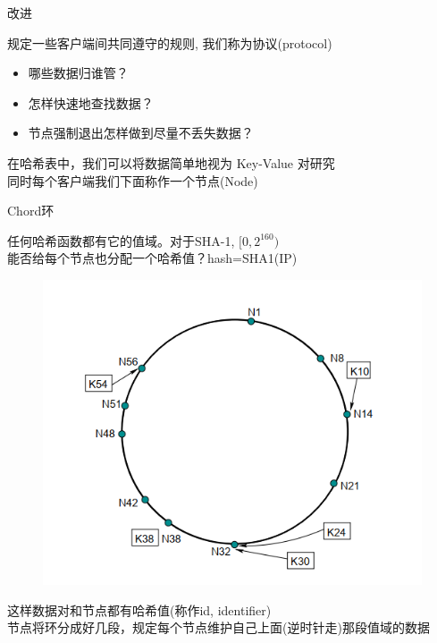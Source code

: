 \documentclass[10pt]{beamer}
\begin{document}
\begin{frame}{改进}

规定一些客户端间共同遵守的规则, 我们称为\alert{协议(protocol)}
	\begin{itemize}
		\item 哪些数据归谁管？
		\item 怎样快速地查找数据？
		\item 节点强制退出怎样做到尽量不丢失数据？
	\end{itemize}
在哈希表中，我们可以将数据简单地视为 Key-Value 对研究\\
同时每个客户端我们下面称作一个节点(Node)
\end{frame}

\begin{frame}{Chord环}

任何哈希函数都有它的值域。对于SHA-1, $[0, 2^{160})$ \\
能否给每个节点也分配一个哈希值？\alert{hash=SHA1(IP)}

\begin{figure}
\centering
\includegraphics[scale=0.5]{figure/ring.png}
\end{figure}

这样数据对和节点都有哈希值(称作id, identifier)\\
节点将环分成好几段，规定每个节点维护自己上面(逆时针走)那段值域的数据

\end{frame}
\end{document}
